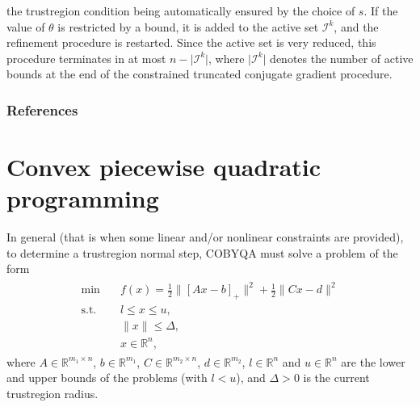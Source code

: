 \documentclass[letterpaper,10pt,english]{sphinxmanual}
\newcommand{\abs}[2][]{#1\lvert#2#1\rvert}
\newcommand{\norm}[2][]{#1\lVert#2#1\rVert}
\def\R{\ensuremath{\mathds{R}}}
\begin{document}
\sphinxAtStartPar
the trust\sphinxhyphen{}region condition being automatically ensured by the choice of
\(s\). If the value of \(\theta\) is restricted by a bound, it is added
to the active set \(\mathcal{I}^k\), and the refinement procedure is
restarted. Since the active set is very reduced, this procedure terminates in
at most \(n - \abs{\mathcal{I}^k}\), where \(\abs{\mathcal{I}^k}\)
denotes the number of active bounds at the end of the constrained truncated
conjugate gradient procedure.
\subsubsection*{References}


\section{Convex piecewise quadratic programming}
\label{\detokenize{algo/linalg.cpqp:convex-piecewise-quadratic-programming}}\label{\detokenize{algo/linalg.cpqp:linalg-cpqp}}\label{\detokenize{algo/linalg.cpqp::doc}}
\sphinxAtStartPar
In general (that is when some linear and/or nonlinear constraints are
provided), to determine a trust\sphinxhyphen{}region normal step, COBYQA must solve a problem
of the form
\begin{equation}\label{equation:algo/linalg.cpqp:cpqp}
\begin{split}\begin{array}{ll}
    \min        & \quad f(x) = \frac{1}{2} \norm{[Ax - b]_+}^2 + \frac{1}{2} \norm{Cx - d}^2\\
    \text{s.t.} & \quad l \le x \le u,\\
                & \quad \norm{x} \le \Delta,\\
                & \quad x \in \R^n,
\end{array}\end{split}
\end{equation}
\sphinxAtStartPar
where \(A \in \R^{m_1 \times n}\), \(b \in \R^{m_1}\),
\(C \in \R^{m_2 \times n}\), \(d \in \R^{m_2}\), \(l \in \R^n\) and
\(u \in \R^n\) are the lower and upper bounds of the problems
(with \(l < u\)), and \(\Delta > 0\) is the current trust\sphinxhyphen{}region
radius.
\end{document}
